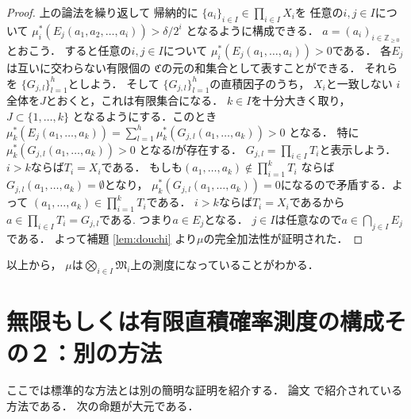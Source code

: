 \documentclass[leqno, a4paper, 12pt]{jsarticle}
\newcommand{\zz}{\mathbb{Z}}
\begin{document}
\begin{proof}
上の論法を繰り返して
帰納的に
$\{a_{i}\}_{i\in I}\in \prod_{i\in I}X_{i}$を
任意の$i, j\in I$について
$\mu_{i}^{*}(E_{j}(a_{1}, a_{2}, \dots, a_{i}))>\delta/2^{i}$
となるように構成できる．
$a=(a_{i})_{i\in \zz_{\ge 0}}$とおこう．
すると任意の$i, j\in I$について
$\mu_{i}^{*}(E_{j}(a_{1}, \dots, a_{i}))>0$である．
各$E_{j}$は互いに交わらない有限個の
$\mathfrak{C}$の元の和集合として表すことができる．
それらを
$\{G_{j, l}\}_{l=1}^{h}$としよう．
そして
$\{G_{j, l}\}_{l=1}^{h}$の直積因子のうち，
$X_{i}$と一致しない
$i$全体を$J$とおくと，これは有限集合になる．
$k\in I$を十分大きく取り，$J\subset \{1, \dots, k\}$
となるようにする．このとき
$\mu_{k}^{*}(E_{j}(a_{1}, \dots, a_{k}))=
\sum_{l=1}^{h}\mu_{k}^{*}(G_{j, l}(a_{1}, \dots, a_{k}))
>0$
となる．
特に
$\mu_{k}^{*}(G_{j, l}(a_{1}, \dots, a_{k}))>0$
となる$l$が存在する．
$G_{j, l}=\prod_{i\in I}T_{i}$と表示しよう．
$i>k$ならば$T_{i}=X_{i}$である．
もしも$(a_{1}, \dots, a_{k})\not\in \prod_{i=1}^{k}T_{i}$
ならば$G_{j, l}(a_{1}, \dots, a_{k})=\emptyset$となり，
$\mu_{k}^{*}(G_{j, l}(a_{1}, \dots, a_{k}))=0$になるので矛盾する．よって
$(a_{1}, \dots, a_{k})\in \prod_{i=1}^{k}T_{i}$である．
$i>k$ならば$T_{i}=X_{i}$であるから
$a\in \prod_{i\in I}T_{i}=G_{j, l}$である.
つまり$a\in E_{j}$となる．
$j\in I$は任意なので$a\in \bigcap_{j\in I}E_{j}$である．
よって補題 \ref{lem:douchi} より$\mu$の完全加法性が証明された．
\end{proof}
以上から，
$\mu$は$\bigotimes_{i\in I}\mathfrak{M}_{i}$上の測度になっていることがわかる．


\section{無限もしくは有限直積確率測度の構成その２：別の方法}


ここでは標準的な方法とは別の簡明な証明を紹介する．
論文 \cite{Sae}で紹介されている方法である．
次の命題が大元である．
\end{document}
